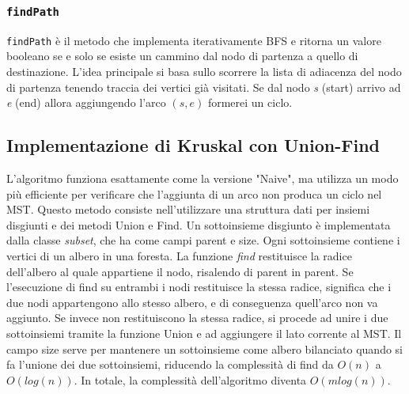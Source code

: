 \subsubsection{\texttt{findPath}}
\texttt{findPath} è il metodo che implementa iterativamente BFS e ritorna un valore booleano se e solo se esiste un cammino dal nodo di partenza a quello di destinazione. L'idea principale si basa sullo scorrere la lista di adiacenza del nodo di partenza tenendo traccia dei vertici già visitati. Se dal nodo \textit{s} (start) arrivo ad \textit{e} (end) allora aggiungendo l'arco $(s, e)$ formerei un ciclo.
\subsection{Implementazione di Kruskal con Union-Find}
L'algoritmo funziona esattamente come la versione "Naive", ma utilizza un modo più efficiente per verificare
che l'aggiunta di un arco non produca un ciclo nel MST. Questo metodo consiste nell'utilizzare una struttura dati per insiemi disgiunti e dei metodi Union e Find. Un sottoinsieme disgiunto è implementata dalla classe \textit{subset}, che
ha come campi parent e size. Ogni sottoinsieme contiene i vertici di un albero in una foresta. La funzione \textit{find} restituisce la radice dell'albero al quale appartiene il nodo, risalendo di parent in parent. Se l'esecuzione di find su entrambi i nodi restituisce la stessa radice,
significa che i due nodi appartengono  allo stesso albero, e di conseguenza quell'arco non va aggiunto. Se invece non restituiscono la stessa radice, si procede ad unire i due sottoinsiemi tramite la funzione Union
e ad aggiungere il lato corrente al MST. Il campo size serve per mantenere un sottoinsieme come albero bilanciato quando si fa l'unione dei due sottoinsiemi, riducendo la complessità di find da $O(n)$ a $O(log(n))$. In totale, la complessità dell'algoritmo diventa $O(m log(n))$.